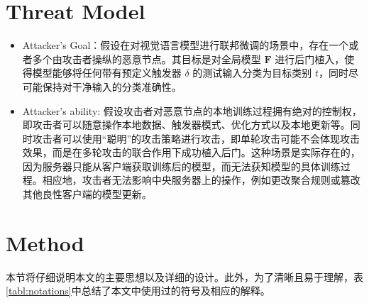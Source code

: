 \documentclass[lettersize,journal]{IEEEtran}
\begin{document}
\section{Threat Model}
\begin{itemize}
    \item Attacker's Goal：假设在对视觉语言模型进行联邦微调的场景中，存在一个或者多个由攻击者操纵的恶意节点。其目标是对全局模型 $\mathbf{F}$ 进行后门植入，使得模型能够将任何带有预定义触发器 $\delta$ 的测试输入分类为目标类别 $t$，同时尽可能保持对干净输入的分类准确性。
    \item Attacker's ability: 假设攻击者对恶意节点的本地训练过程拥有绝对的控制权，即攻击者可以随意操作本地数据、触发器模式、优化方式以及本地更新等。同时攻击者可以使用“聪明”的攻击策略进行攻击，即单轮攻击可能不会体现攻击效果，而是在多轮攻击的联合作用下成功植入后门。这种场景是实际存在的，因为服务器只能从客户端获取训练后的模型，而无法获知模型的具体训练过程。相应地，攻击者无法影响中央服务器上的操作，例如更改聚合规则或篡改其他良性客户端的模型更新。
\end{itemize}

\section{Method}
本节将仔细说明本文的主要思想以及详细的设计。此外，为了清晰且易于理解，表\ref{tabl:notations}中总结了本文中使用过的符号及相应的解释。
\end{document}
